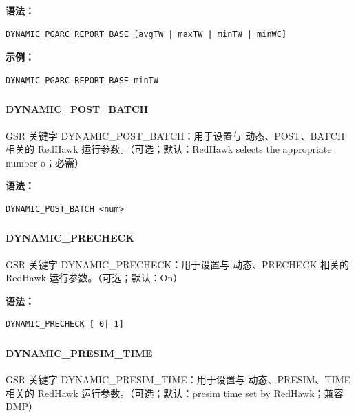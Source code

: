 \textbf{语法：}
\begin{lstlisting}
DYNAMIC_PGARC_REPORT_BASE [avgTW | maxTW | minTW | minWC]
\end{lstlisting}

\textbf{示例：}
\begin{lstlisting}
DYNAMIC_PGARC_REPORT_BASE minTW
\end{lstlisting}

\subsubsection{}
\paragraph*{DYNAMIC_POST_BATCH}

GSR 关键字 DYNAMIC_POST_BATCH：用于设置与 动态、POST、BATCH 相关的 RedHawk 运行参数。（可选；默认：RedHawk selects the appropriate number o；必需）

\textbf{语法：}
\begin{lstlisting}
DYNAMIC_POST_BATCH <num>
\end{lstlisting}

\subsubsection{}
\paragraph*{DYNAMIC_PRECHECK}

GSR 关键字 DYNAMIC_PRECHECK：用于设置与 动态、PRECHECK 相关的 RedHawk 运行参数。（可选；默认：On）

\textbf{语法：}
\begin{lstlisting}
DYNAMIC_PRECHECK [ 0| 1]
\end{lstlisting}

\subsubsection{}
\paragraph*{DYNAMIC_PRESIM_TIME}

GSR 关键字 DYNAMIC_PRESIM_TIME：用于设置与 动态、PRESIM、TIME 相关的 RedHawk 运行参数。（可选；默认：presim time set by RedHawk；兼容 DMP）


